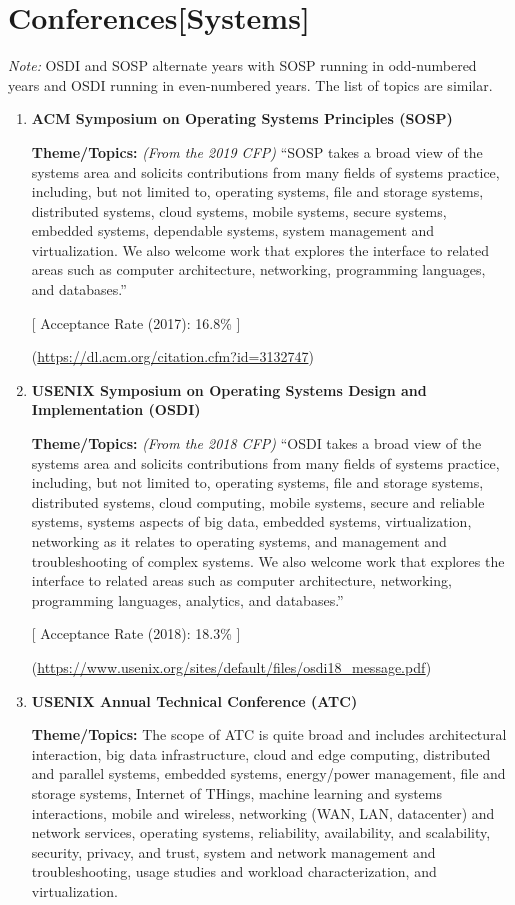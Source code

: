 \section*{Conferences[Systems]}
\emph{Note:} OSDI and SOSP alternate years with SOSP running in odd-numbered years and OSDI running in even-numbered years. The list of topics are similar.
\begin{enumerate}[resume]
\tightlist
\item \textbf{ACM Symposium on Operating Systems Principles (SOSP)}

\textbf{Theme/Topics:} \emph{(From the 2019 CFP)} ``SOSP takes a broad view of the systems area and solicits contributions from many fields of systems practice, including, but not limited to, operating systems, file and storage systems, distributed systems, cloud systems, mobile systems, secure systems, embedded systems, dependable systems, system management and virtualization. We also welcome work that explores the interface to related areas such as computer architecture, networking, programming languages, and databases.''

[ Acceptance Rate (2017): 16.8\% ]

(\url{https://dl.acm.org/citation.cfm?id=3132747})

\item \textbf{USENIX Symposium on Operating Systems Design and Implementation (OSDI)}

\textbf{Theme/Topics:} \emph{(From the 2018 CFP)} ``OSDI takes a broad view of the systems area and solicits contributions from many fields of systems practice, including, but not limited to, operating systems, file and storage systems, distributed systems, cloud computing, mobile systems, secure and reliable systems, systems aspects of big data, embedded systems, virtualization, networking as it relates to operating systems, and management and troubleshooting of complex systems. We also welcome work that explores the interface to related areas such as computer architecture, networking, programming languages, analytics, and databases.''

[ Acceptance Rate (2018): 18.3\% ]

(\url{https://www.usenix.org/sites/default/files/osdi18_message.pdf})

\item \textbf{USENIX Annual Technical Conference (ATC)}

\textbf{Theme/Topics:} The scope of ATC is quite broad and includes architectural interaction, big data infrastructure, cloud and edge computing, distributed and parallel systems, embedded systems, energy/power management, file and storage systems, Internet of THings, machine learning and systems interactions, mobile and wireless, networking (WAN, LAN, datacenter) and network services, operating systems, reliability, availability, and scalability, security, privacy, and trust, system and network management and troubleshooting, usage studies and workload characterization, and virtualization.


\end{enumerate}
